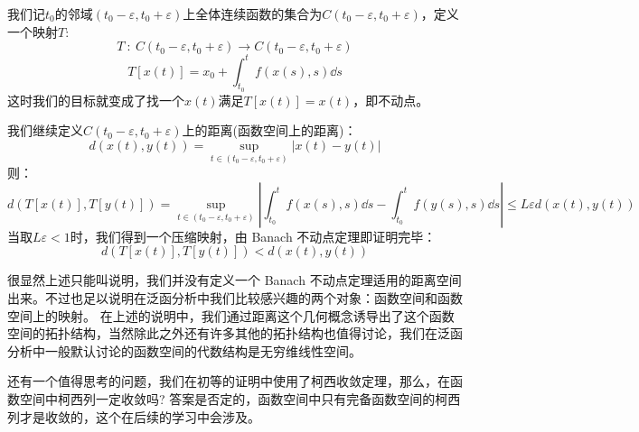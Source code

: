 我们记$t_0$的邻域$(t_0-\varepsilon,t_0+\varepsilon)$上全体连续函数的集合为$C(t_0-\varepsilon,t_0+\varepsilon)$，定义一个映射$T$:
\[T \ : \ C(t_0-\varepsilon,t_0+\varepsilon) \rightarrow C(t_0-\varepsilon,t_0+\varepsilon)\]
\[T[x(t)]=x_0+\int_{t_0}^tf(x(s),s)\dd s\]
这时我们的目标就变成了找一个$x(t)$满足$T[x(t)]=x(t)$，即不动点。

我们继续定义$C(t_0-\varepsilon,t_0+\varepsilon)$上的距离(函数空间上的距离)：
\[d(x(t),y(t))={\mathop {\text{sup}}\limits_{t \in (t_0-\varepsilon,t_0+\varepsilon)}} |x(t)-y(t)|\]
则：
\[d(T[x(t)],T[y(t)])={\mathop {\text{sup}}\limits_{t \in (t_0-\varepsilon,t_0+\varepsilon)}} \left|\int_{t_0}^tf(x(s),s)\dd s-\int_{t_0}^tf(y(s),s)\dd s \right| \leq L\varepsilon d(x(t),y(t))\]
当取$L\varepsilon < 1$时，我们得到一个压缩映射，由 Banach 不动点定理即证明完毕：
\[d(T[x(t)],T[y(t)]) < d(x(t),y(t))\]

很显然上述只能叫说明，我们并没有定义一个 Banach 不动点定理适用的距离空间出来。不过也足以说明在泛函分析中我们比较感兴趣的两个对象：函数空间和函数空间上的映射。
在上述的说明中，我们通过距离这个几何概念诱导出了这个函数空间的拓扑结构，当然除此之外还有许多其他的拓扑结构也值得讨论，我们在泛函分析中一般默认讨论的函数空间的代数结构是无穷维线性空间。

还有一个值得思考的问题，我们在初等的证明中使用了柯西收敛定理，那么，在函数空间中柯西列一定收敛吗?
答案是否定的，函数空间中只有完备函数空间的柯西列才是收敛的，这个在后续的学习中会涉及。